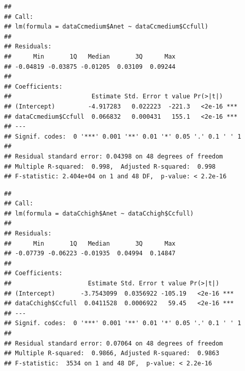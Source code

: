 \documentclass[
]{krantz}
\makeatletter
\newenvironment{Shaded}{\begin{snugshade}}{\end{snugshade}}
\newcommand{\DecValTok}[1]{\textcolor[rgb]{0.00,0.00,0.81}{#1}}
\newcommand{\KeywordTok}[1]{\textcolor[rgb]{0.13,0.29,0.53}{\textbf{#1}}}
\newcommand{\NormalTok}[1]{#1}
\newcommand{\OperatorTok}[1]{\textcolor[rgb]{0.81,0.36,0.00}{\textbf{#1}}}
\newcommand{\StringTok}[1]{\textcolor[rgb]{0.31,0.60,0.02}{#1}}
\newenvironment{kframe}{%
\medskip{}
\setlength{\fboxsep}{.8em}
 \def\at@end@of@kframe{}%
 \ifinner\ifhmode%
  \def\at@end@of@kframe{\end{minipage}}%
  \begin{minipage}{\columnwidth}%
 \fi\fi%
 \def\FrameCommand##1{\hskip\@totalleftmargin \hskip-\fboxsep
 \colorbox{shadecolor}{##1}\hskip-\fboxsep
     \hskip-\linewidth \hskip-\@totalleftmargin \hskip\columnwidth}%
 \MakeFramed {\advance\hsize-\width
   \@totalleftmargin\z@ \linewidth\hsize
   \@setminipage}}%
 {\par\unskip\endMakeFramed%
 \at@end@of@kframe}
\renewenvironment{Shaded}{\begin{kframe}}{\end{kframe}}
\makeatother
\begin{document}
\begin{verbatim}
## 
## Call:
## lm(formula = dataCcmedium$Anet ~ dataCcmedium$Ccfull)
## 
## Residuals:
##      Min       1Q   Median       3Q      Max 
## -0.04819 -0.03875 -0.01205  0.03109  0.09244 
## 
## Coefficients:
##                      Estimate Std. Error t value Pr(>|t|)    
## (Intercept)         -4.917283   0.022223  -221.3   <2e-16 ***
## dataCcmedium$Ccfull  0.066832   0.000431   155.1   <2e-16 ***
## ---
## Signif. codes:  0 '***' 0.001 '**' 0.01 '*' 0.05 '.' 0.1 ' ' 1
## 
## Residual standard error: 0.04398 on 48 degrees of freedom
## Multiple R-squared:  0.998,  Adjusted R-squared:  0.998 
## F-statistic: 2.404e+04 on 1 and 48 DF,  p-value: < 2.2e-16
\end{verbatim}

\begin{Shaded}
\end{Shaded}

\begin{verbatim}
## 
## Call:
## lm(formula = dataCchigh$Anet ~ dataCchigh$Ccfull)
## 
## Residuals:
##      Min       1Q   Median       3Q      Max 
## -0.07739 -0.06223 -0.01935  0.04994  0.14847 
## 
## Coefficients:
##                     Estimate Std. Error t value Pr(>|t|)    
## (Intercept)       -3.7543099  0.0356922 -105.19   <2e-16 ***
## dataCchigh$Ccfull  0.0411528  0.0006922   59.45   <2e-16 ***
## ---
## Signif. codes:  0 '***' 0.001 '**' 0.01 '*' 0.05 '.' 0.1 ' ' 1
## 
## Residual standard error: 0.07064 on 48 degrees of freedom
## Multiple R-squared:  0.9866, Adjusted R-squared:  0.9863 
## F-statistic:  3534 on 1 and 48 DF,  p-value: < 2.2e-16
\end{verbatim}
\end{document}

